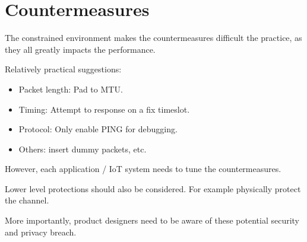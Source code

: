 \section{Countermeasures}

The constrained environment makes the countermeasures difficult the practice, as they all greatly impacts the performance.

Relatively practical suggestions:
\begin{itemize}
	\item Packet length: Pad to MTU.
	\item Timing: Attempt to response on a fix timeslot.
	\item Protocol: Only enable PING for debugging.
	\item Others: insert dummy packets, etc.
\end{itemize}

However, each application / IoT system needs to tune the countermeasures.

Lower level protections should also be considered. For example physically protect the channel.

More importantly, product designers need to be aware of these potential security and privacy breach.
